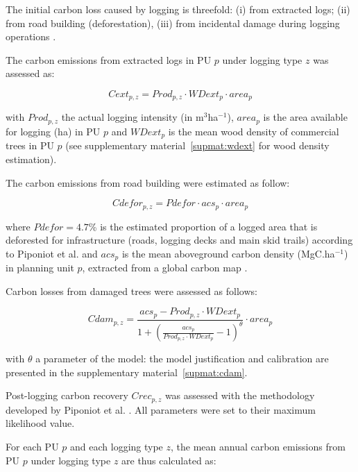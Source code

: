 \documentclass{article}
\begin{document}
The initial carbon loss caused by logging is threefold: (i) from extracted logs; (ii) from road building (deforestation), (iii) from incidental damage during logging operations \cite{Piponiot2016}. 

The carbon emissions from extracted logs in PU $p$ under logging type $z$ was assessed as: 

\begin{equation}
\label{eq:cext}
    Cext_{p,z} = Prod_{p,z} \cdot WDext_p \cdot  area_p
\end{equation}

with $Prod_{p,z}$ the actual logging intensity (in m$^3$ha$^{-1}$), $area_p$ is the area available for logging (ha) in PU $p$ and $WDext_p$ is the mean wood density of commercial trees in PU $p$ (see supplementary material~\ref{supmat:wdext} for wood density estimation). 

The carbon emissions from road building were estimated as follow: 

\begin{equation}
\label{eq:croad}
    Cdefor_{p,z} = Pdefor \cdot acs_p \cdot area_p
\end{equation}

where $Pdefor = 4.7 $\% is the estimated proportion of a logged area that is deforested for infrastructure (roads, logging decks and main skid trails) according to Piponiot et al. \cite{Piponiot2016} and $acs_p$ is the mean aboveground carbon density (MgC.ha$^{-1}$) in planning unit $p$, extracted from a global carbon map \cite{Avitabile2016}. 

Carbon losses from damaged trees were assessed as follows: 

\begin{equation}
\label{eq:cdam}
    Cdam_{p,z} = \frac{acs_p  - Prod_{p,z} \cdot WDext_p } {1 + \left(\frac{acs_p}{Prod_{p,z} \cdot WDext_p}  -1 \right)^\theta} \cdot area_p
\end{equation}

with $\theta$ a parameter of the model: the model justification and calibration are presented in the supplementary material~\ref{supmat:cdam}. 

Post-logging carbon recovery $Crec_{p,z}$ was assessed with the methodology developed by Piponiot et al. \cite{Piponiot2016a}.  
All parameters were set to their maximum likelihood value. 

For each PU $p$ and each logging type $z$, the mean annual carbon emissions from PU $p$ under logging type $z$ are thus calculated as: 
\end{document}

